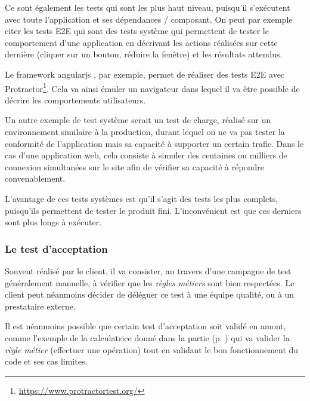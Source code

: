 Ce sont également les tests qui sont les plus haut niveau, puisqu'il s'exécutent avec toute l'application et ses dépendances / composant. On peut par exemple citer les tests \gls{E2E} qui sont des tests système qui permettent de tester le comportement d'une application en décrivant les actions réalisées sur cette dernière (cliquer sur un bouton, réduire la fenêtre) et les résultats attendus.

Le \gls{framework} \gls{angularjs} , par exemple, permet de réaliser des tests \gls{E2E} avec Protractor\footnote{\url{https://www.protractortest.org/}}. Cela va ainsi émuler un navigateur dans lequel il va être possible de décrire les comportements utilisateurs. 

Un autre exemple de test système serait un test de charge, réalisé sur un environnement similaire à la production, durant lequel on ne va pas tester la conformité de l'application mais sa capacité à supporter un certain trafic. Dans le cas d'une application web, cela consiste à simuler des centaines ou milliers de connexion simultanées sur le site afin de vérifier sa capacité à répondre convenablement. 

L'avantage de ces tests systèmes est qu'il s'agit des tests les plus complets, puisqu'ils permettent de tester le produit fini. L'inconvénient est que ces derniers sont plus longs à exécuter.


\subsubsection{Le test d'acceptation}\label{test-acceptation}

Souvent réalisé par le client, il va consister, au travers d'une campagne de test généralement manuelle, à vérifier que les \emph{règles métiers} sont bien respectées. Le client peut néanmoins décider de déléguer ce test à une équipe qualité, ou à un prestataire externe.

Il est néanmoins possible que certain test d'acceptation soit validé en amont, comme l'exemple de la calculatrice donné dans la partie  (p. \pageref{test-composant}) qui va valider la \emph{règle métier} (effectuer une opération) tout en validant le bon fonctionnement du code et ses cas limites.

